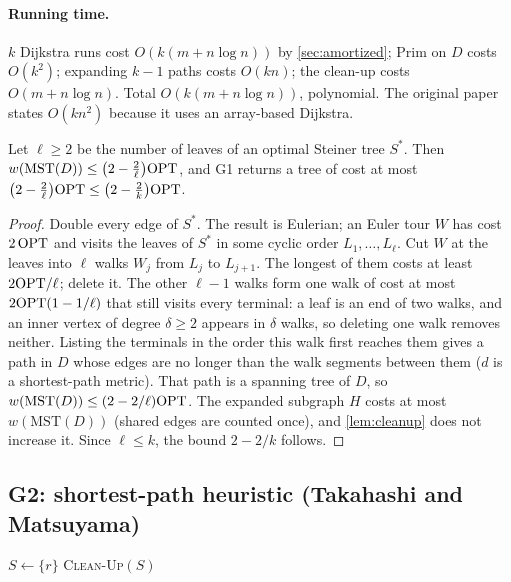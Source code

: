 \paragraph{Running time.} \(k\) Dijkstra runs cost \(O(k(m+n\log n))\) by \cref{sec:amortized}; Prim on \(D\) costs \(O(k^2)\);
expanding \(k-1\) paths costs \(O(kn)\); the clean-up costs \(O(m+n\log n)\). Total \(O(k(m+n\log n))\), polynomial.
The original paper states \(O(kn^2)\) because it uses an array-based Dijkstra.

\begin{theorem}\label{thm:kmb}
Let \(\ell\ge2\) be the number of leaves of an optimal Steiner tree \(S^\ast\). Then
\(w(\mathrm{MST}(D))\le\big(2-\tfrac{2}{\ell}\big)\mathrm{OPT}\), and G1 returns a tree of cost at most \(\big(2-\tfrac{2}{\ell}\big)\mathrm{OPT}\le\big(2-\tfrac2k\big)\mathrm{OPT}\).
\end{theorem}
\begin{proof}
Double every edge of \(S^\ast\). The result is Eulerian; an Euler tour \(W\) has cost \(2\,\mathrm{OPT}\) and visits the leaves
of \(S^\ast\) in some cyclic order \(L_1,\dots,L_\ell\). Cut \(W\) at the leaves into \(\ell\) walks \(W_j\) from \(L_j\) to
\(L_{j+1}\). The longest of them costs at least \(2\mathrm{OPT}/\ell\); delete it. The other \(\ell-1\) walks form one walk of cost at
most \(2\mathrm{OPT}(1-1/\ell)\) that still visits every terminal: a leaf is an end of two walks, and an inner vertex of degree
\(\delta\ge2\) appears in \(\delta\) walks, so deleting one walk removes neither. Listing the terminals in the order this walk
first reaches them gives a path in \(D\) whose edges are no longer than the walk segments between them (\(d\) is a shortest-path
metric). That path is a spanning tree of \(D\), so \(w(\mathrm{MST}(D))\le(2-2/\ell)\mathrm{OPT}\). The expanded subgraph \(H\) costs at most
\(w(\mathrm{MST}(D))\) (shared edges are counted once), and \cref{lem:cleanup} does not increase it. Since \(\ell\le k\), the bound
\(2-2/k\) follows.
\end{proof}

\subsection{G2: shortest-path heuristic (Takahashi and Matsuyama)}
\begin{algorithm}[!htbp]
\(S\gets\{r\}\)\;
\Return \textsc{Clean-Up}\((S)\)\;
\caption{G2 for one root \(r\) (\texttt{src/greedy2\_sph.cpp}). The solver runs every terminal as the root and keeps the best tree.}
\end{algorithm}

